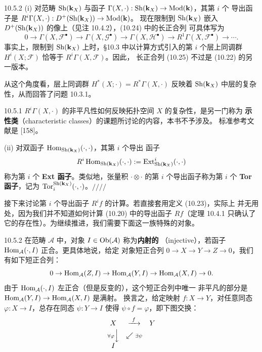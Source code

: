 \begin{wexam}{10.5.2}
(i) 对范畴 $\operatorname{Sh}(\mathbf{k}_X)$ 与函子
$\Gamma(X,\cdot):\operatorname{Sh}(\mathbf{k}_X)\to\operatorname{Mod}(\mathbf{k})$，其第 $i$ 个
导出函子是
$R^i\Gamma(X,\cdot):D^+(\operatorname{Sh}(\mathbf{k}_X))\to\operatorname{Mod}(\mathbf{k})$。
现在限制到 $\operatorname{Sh}(\mathbf{k}_X)$ 嵌入
$D^+(\operatorname{Sh}(\mathbf{k}_X))$ 的像上（见注 10.4.2），(10.24) 中的长正合列
可具体写为
\begin{equation}\tag{10.25}
  0\to\Gamma(X,\mathcal F^{\bullet})
  \to\Gamma(X,\mathcal G^{\bullet})
  \to\Gamma(X,\mathcal H^{\bullet})
  \to R^1\Gamma(X,\mathcal F^{\bullet})\to\cdots .
\end{equation}
事实上，限制到 $\operatorname{Sh}(\mathbf{k}_X)$ 上时，§10.3 中以计算方式引入的第 $i$
个层上同调群 $H^i(X;\mathcal F)$ 恰等于 $R^i\Gamma(X,\mathcal F)$。因此，
长正合列 (10.25) 不过是 (10.22) 的另一版本。
\end{wexam}

从这个角度看，层上同调群 $H^*(X;\cdot)=R^*\Gamma(X,\cdot)$ 反映着
$\operatorname{Sh}(\mathbf{k}_X)$ 中层的复杂性，从而回答了问题 10.3.1。

\begin{wrem}{10.5.1}
$R^i\Gamma(X,\cdot)$ 的非平凡性如何反映拓扑空间 $X$ 的复杂性，是另一门称为
\textbf{示性类}（characteristic classes）的课题所讨论的内容，本书不予涉及。
标准参考文献是 [158]。
\end{wrem}

(ii) 对双函子 $\operatorname{Hom}_{\operatorname{Sh}(\mathbf{k}_X)}(\cdot,\cdot)$，其第 $i$ 个导出
函子
\[
  R^i\operatorname{Hom}_{\operatorname{Sh}(\mathbf{k}_X)}(\cdot,\cdot)
  :=\operatorname{Ext}^i_{\operatorname{Sh}(\mathbf{k}_X)}(\cdot,\cdot)
\]
称为第 $i$ 个 \textbf{Ext 函子}。类似地，张量积 $\cdot\otimes\cdot$ 的第 $i$
个导出函子称为第 $i$ 个 \textbf{Tor 函子}，记为
$\operatorname{Tor}_i^{\operatorname{Sh}(\mathbf{k}_X)}(\cdot,\cdot)$。\hfill$//$\hfill$//$

接下来讨论第 $i$ 个导出函子 $R^if$ 的计算。若直接套用定义 (10.23)，实际上
并无用处，因为我们并不知道如何计算 (10.20) 中的导出函子 $Rf$（定理 10.4.1
只确认了它的存在性）。为继续推进，我们需要下面这一族特殊的对象。

\begin{wdefn}{10.5.2}
在范畴 $\mathcal A$ 中，对象 $I\in\operatorname{Ob}(\mathcal A)$ 称为\textbf{内射的}
（injective），若函子 $\operatorname{Hom}_{\mathcal A}(\cdot,I)$ 正合。更具体地说，给定
对象短正合列 $0\to X\to Y\to Z\to 0$，我们有如下短正合列：
\[
  0\to\operatorname{Hom}_{\mathcal A}(Z,I)\to\operatorname{Hom}_{\mathcal A}(Y,I)
  \to\operatorname{Hom}_{\mathcal A}(X,I)\to0 .
\]
由于 $\operatorname{Hom}_{\mathcal A}(\cdot,I)$ 左正合（但是反变的），这个短正合列中唯一
非平凡的部分是 $\operatorname{Hom}_{\mathcal A}(Y,I)\to\operatorname{Hom}_{\mathcal A}(X,I)$ 是满射。
换言之，给定映射 $f:X\to Y$，对任意同态 $\varphi:X\to I$，总存在同态
$\psi:Y\to I$ 使得 $\psi\circ f=\varphi$，即下图交换：
\[
\begin{array}{ccc}
X & \xrightarrow{\ f\ } & Y\\[2pt]
{\scriptstyle\forall\varphi}\Big\downarrow
 & \swarrow{\scriptstyle\exists\psi} & \\[2pt]
I & &
\end{array}
\]
\end{wdefn}

